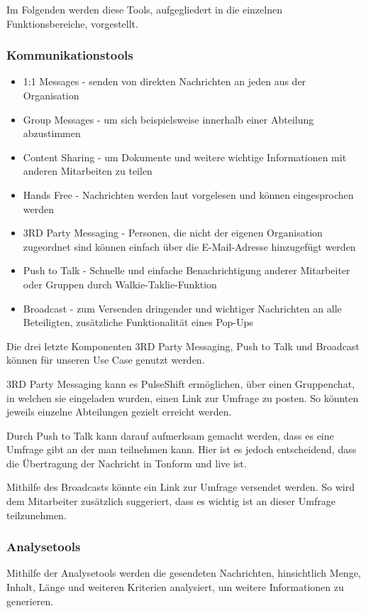 Im Folgenden werden diese Tools, aufgegliedert in die einzelnen Funktionsbereiche, vorgestellt.

\subsubsection{Kommunikationstools}

\begin{itemize}
\item 1:1 Messages - senden von direkten Nachrichten an jeden aus der Organisation
\item Group Messages - um sich beispielsweise innerhalb einer Abteilung abzustimmen
\item Content Sharing - um Dokumente und weitere wichtige Informationen mit anderen Mitarbeiten zu teilen
\item Hands Free - Nachrichten werden laut vorgelesen und können eingesprochen werden
\item 3RD Party Messaging - Personen, die nicht der eigenen Organisation zugeordnet sind können einfach über die E-Mail-Adresse hinzugefügt werden
\item Push to Talk - Schnelle und einfache Benachrichtigung anderer Mitarbeiter oder Gruppen durch Walkie-Taklie-Funktion
\item Broadcast - zum Versenden dringender und wichtiger Nachrichten an alle Beteiligten, zusätzliche Funktionalität eines Pop-Ups
\end{itemize}

Die drei letzte Komponenten 3RD Party Messaging, Push to Talk und Broadcast können für unseren Use Case genutzt werden.

3RD Party Messaging kann es PulseShift ermöglichen, über einen Gruppenchat, in welchen sie eingeladen wurden, einen Link zur Umfrage zu posten. So könnten jeweils einzelne Abteilungen gezielt erreicht werden.

Durch Push to Talk kann darauf aufmerksam gemacht werden, dass es eine Umfrage gibt an der man teilnehmen kann. Hier ist es jedoch entscheidend, dass die Übertragung der Nachricht in Tonform und live ist. 

Mithilfe des Broadcasts könnte ein Link zur Umfrage versendet werden. So wird dem Mitarbeiter zusätzlich suggeriert, dass es wichtig ist an dieser Umfrage teilzunehmen. 

\subsubsection{Analysetools}
Mithilfe der Analysetools werden die gesendeten Nachrichten, hinsichtlich Menge, Inhalt, Länge und weiteren Kriterien analysiert, um weitere Informationen zu generieren. 

